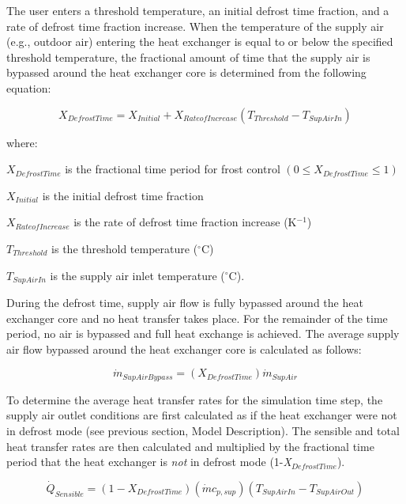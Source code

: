The user enters a threshold temperature, an initial defrost time fraction, and a rate of defrost time fraction increase. When the temperature of the supply air (e.g., outdoor air) entering the heat exchanger is equal to or below the specified threshold temperature, the fractional amount of time that the supply air is bypassed around the heat exchanger core is determined from the following equation:

\begin{equation}
{X_{DefrostTime}} = {X_{Initial}} + {X_{RateofIncrease}}({T_{Threshold}} - {T_{SupAirIn}})
\end{equation}

where:

\({X_{DefrostTime}}\) is the fractional time period for frost control \(\left( {0 \leq {X_{DefrostTime}} \leq 1} \right)\)

\({X_{Initial}}\) is the initial defrost time fraction

\({X_{RateofIncrease}}\) is the rate of defrost time fraction increase (K\(^{-1}\))

\({T_{Threshold}}\) is the threshold temperature (\(^{\circ}\)C)

\({T_{SupAirIn}}\) is the supply air inlet temperature (\(^{\circ}\)C).

During the defrost time, supply air flow is fully bypassed around the heat exchanger core and no heat transfer takes place. For the remainder of the time period, no air is bypassed and full heat exchange is achieved. The average supply air flow bypassed around the heat exchanger core is calculated as follows:

\begin{equation}
{\dot{m}_{SupAirBypass}} = ({X_{DefrostTime}}){\dot{m}_{SupAir}}
\end{equation}

To determine the average heat transfer rates for the simulation time step, the supply air outlet conditions are first calculated as if the heat exchanger were not in defrost mode (see previous section, Model Description). The sensible and total heat transfer rates are then calculated and multiplied by the fractional time period that the heat exchanger is \emph{not} in defrost mode (1-\emph{X\(_{DefrostTime}\)}).

\begin{equation}
{\dot{Q}_{Sensible}} = (1 - {X_{DefrostTime}})\left( {\dot{m} c_{p,sup}} \right)({T_{SupAirIn}} - {T_{SupAirOut}})
\end{equation}

